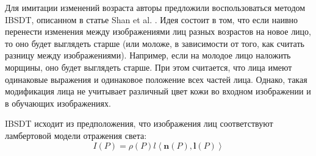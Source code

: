 Для имитации изменений возраста авторы предложили воспользоваться методом IBSDT, описанном в статье Shan et al. \cite{shan}. Идея состоит в том, что если наивно перенести изменения между изображениями лиц разных возрастов на новое лицо, то оно будет выглядеть старше (или моложе, в зависимости от того, как считать разницу между изображениями). Например, если на молодое лицо наложить морщины, оно будет выглядеть старше. При этом считается, что лица имеют одинаковые выражения и одинаковое положение всех частей лица. Однако, такая модификация лица не учитывает различный цвет кожи во входном изображении и в обучающих изображениях.

IBSDT исходит из предположения, что изображения лиц соответствуют ламбертовой модели отражения света:
$$
I(P) = \rho(P) l \left \langle \mathbf{n}(P), \mathbf{l}(P) \right \rangle
$$

